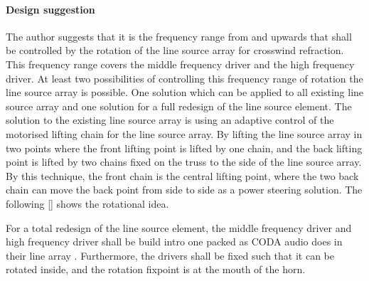 \paragraph{Design suggestion} 
The author suggests that it is the frequency range from  and upwards that shall be controlled by the rotation of the line source array for crosswind refraction. This frequency range covers the middle frequency driver and the high frequency driver. At least two possibilities of controlling this frequency range of rotation the line source array is possible. One solution which can be applied to all existing line source array and one solution for a full redesign of the line source element. The solution to the existing line source array is using an adaptive control of the motorised lifting chain for the line source array. By lifting the line source array in two points where the front lifting point is lifted by one chain, and the back lifting point is lifted by two chains fixed on the truss to the side of the line source array. By this technique, the front chain is the central lifting point, where the two back chain can move the back point from side to side as a power steering solution. The following \autoref{} shows the rotational idea.



 For a total redesign of the line source element, the middle frequency driver and high frequency driver shall be build intro one packed as CODA audio does in their line array \citep{coda_ddp}. Furthermore, the drivers shall be fixed such that it can be rotated inside, and the rotation fixpoint is at the mouth of the horn.   

